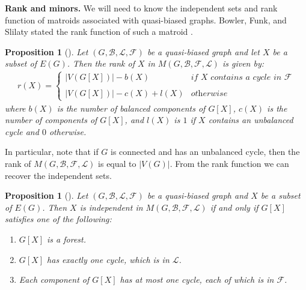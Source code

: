 \documentclass[12pt]{article}
\newtheorem{proposition}[theorem]{Proposition}
\theoremstyle{definition}
\theoremstyle{plain} %
\newcommand{\cB}{\mathcal{B}}
\newcommand{\cF}{\mathcal{F}}
\newcommand{\cL}{\mathcal{L}}
\begin{document}
\bigskip
\noindent 
\textbf{Rank and minors.}
We will need to know the independent sets and rank function of matroids associated with quasi-biased graphs.
Bowler, Funk, and Slilaty stated the rank function of such a matroid \cite[Lemma 2.4]{Bowler-Funk-Slilaty20}.


\begin{proposition}[{\cite[Lemma 2.4]{Bowler-Funk-Slilaty20}}]\label{prop: rank of X}
Let $(G, \cB, \cL, \cF)$ be a quasi-biased graph and let $X$ be a subset of $E(G)$. Then the rank of $X$ in $M(G,\cB,\cF,\cL)$ is given by:
\begin{align*}
    r(X)=\begin{cases} \lvert V(G[X])\rvert-b(X) & \textit{if $X$ contains a cycle in $\cF$}\\\\
    \lvert V(G[X])\rvert-c(X)+l(X) &\textit{otherwise}
    \end{cases}  
\end{align*}
where $b(X)$ is the number of balanced components of $G[X]$, $c(X)$ is the number of components of $G[X]$, and $l(X)$ is $1$ if $X$ contains an unbalanced cycle and $0$ otherwise. 
\end{proposition}

In particular, note that if $G$ is connected and has an unbalanced cycle, then the rank of $M(G, \cB, \cF, \cL)$ is equal to $|V(G)|$.
From the rank function we can recover the independent sets.


\begin{proposition}[{\cite[Theorem 5.1]{Bowler-Funk-Slilaty20}}]\label{prop: independent sets of a quasi-graphic matroid}
Let $(G, \cB, \cL, \cF)$ be a quasi-biased graph and $X$ be a subset of $E(G)$. Then $X$ is independent in $M(G,\cB,\cF,\cL)$ if and only if $G[X]$ satisfies one of the following:
\begin{enumerate}[$(i)$]
    \item $G[X]$ is a forest.
    \item $G[X]$ has exactly one cycle, which is in $\cL$.
    \item Each component of $G[X]$ has at most one cycle, each of which is in $\cF$.
\end{enumerate}
\end{proposition}
\end{document}
